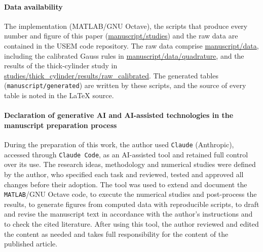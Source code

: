 \documentclass{article}
\begin{document}
\paragraph{Data availability} The implementation (MATLAB/GNU Octave), the scripts that produce every number and figure of this paper (\url{manuscript/studies}) and the raw data are contained in the USEM code repository. The raw data comprise \url{manuscript/data}, including the calibrated Gauss rules in \url{manuscript/data/quadrature}, and the results of the thick-cylinder study in \url{studies/thick_cylinder/results/raw_calibrated}. The generated tables (\texttt{manuscript/generated}) are written by these scripts, and the source of every table is noted in the LaTeX source.
%
\paragraph{Declaration of generative AI and AI-assisted technologies in the manuscript preparation process} During the preparation of this work, the author used \texttt{Claude} (Anthropic), accessed through \texttt{Claude Code}, as an AI-assisted tool and retained full control over its use. The research ideas, methodology and numerical studies were defined by the author, who specified each task and reviewed, tested and approved all changes before their adoption. The tool was used to extend and document the \texttt{MATLAB}/GNU Octave code, to execute the numerical studies and post-process the results, to generate figures from computed data with reproducible scripts, to draft and revise the manuscript text in accordance with the author's instructions and to check the cited literature. After using this tool, the author reviewed and edited the content as needed and takes full responsibility for the content of the published article.
%

%

{}

%
\end{document}
